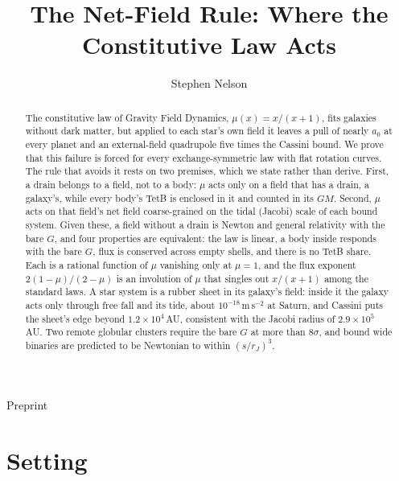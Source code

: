 \documentclass[twocolumn]{iopjournal}
\renewcommand{\articletype}[1]{%
  {\vspace*{-8mm}\noindent \Large \sf Preprint}\par
  \vspace*{6mm}\noindent{\scriptsize \sf{\bfseries \MakeUppercase{#1}}}}
\theoremstyle{definition}
\theoremstyle{remark}
\begin{document}
\articletype{Proof}

\title{The Net-Field Rule: Where the Constitutive Law Acts}

\author{Stephen Nelson}



\begin{abstract}
The constitutive law of Gravity Field Dynamics, $\mu(x) = x/(x+1)$,
fits galaxies without dark matter, but applied to each star's own field
it leaves a pull of nearly $a_0$ at every planet and an external-field
quadrupole five times the Cassini bound. We prove that this failure is
forced for every exchange-symmetric law with flat rotation curves. The
rule that avoids it rests on two premises, which we state rather than
derive. First, a drain belongs to a field, not to a body: $\mu$ acts only
on a field that has a drain, a galaxy's, while every body's TetB is
enclosed in it and counted in its $GM$. Second, $\mu$ acts on that
field's net field coarse-grained on the tidal (Jacobi) scale of each
bound system. Given these, a field without a drain is Newton and general
relativity with the bare $G$, and four properties are equivalent: the
law is linear, a body inside responds with the bare $G$, flux is
conserved across empty shells, and there is no TetB share. Each is a
rational function of $\mu$ vanishing only at $\mu = 1$, and the flux
exponent $2(1-\mu)/(2-\mu)$ is an involution of $\mu$ that singles out
$x/(x+1)$ among the standard laws. A star system is a rubber sheet in its
galaxy's field: inside it the galaxy acts only through free fall and its
tide, about $10^{-18}$\,m\,s$^{-2}$ at Saturn, and Cassini puts the
sheet's edge beyond $1.2 \times 10^4$\,AU, consistent with the Jacobi
radius of $2.9 \times 10^5$\,AU. Two remote globular clusters require
the bare $G$ at more than $8\sigma$, and bound wide binaries are
predicted to be Newtonian to within $(s/r_J)^3$.
\end{abstract}



\section*{Setting}
\end{document}
